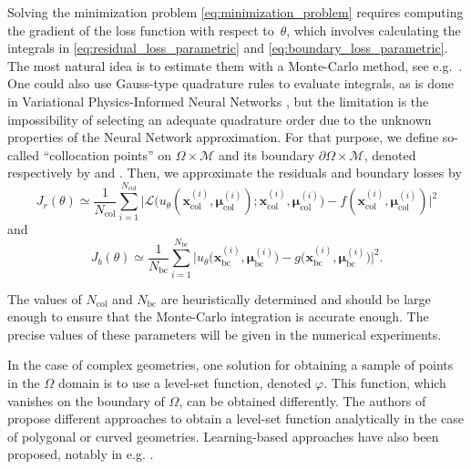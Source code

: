 Solving the minimization problem \eqref{eq:minimization_problem}
requires computing the gradient of the loss function with respect to~$\theta$, which involves calculating the integrals
in \eqref{eq:residual_loss_parametric} and \eqref{eq:boundary_loss_parametric}.
The most natural idea is to estimate them with a Monte-Carlo method, see e.g.~\cite{Caf1998}.
One could also use Gauss-type quadrature rules to evaluate integrals, as is done in Variational Physics-Informed
Neural Networks \cite{KhaZhaKar2021}, but the limitation is the impossibility of selecting an adequate
quadrature order due to the unknown properties of the Neural Network approximation.
For that purpose, we define so-called ``collocation points'' on $\Omega\times\mathcal{M}$ and its boundary $\partial\Omega\times \mathcal{M}$,
denoted respectively by  and .
Then, we approximate the residuals and boundary losses by
\begin{equation*}\label{eq:residual_loss_parametric_MC}
	J_r(\theta) \simeq
	\frac{1}{N_\text{col}} \sum_{i=1}^{N_\text{col}} \big| \mathcal{L}\big(u_\theta(\bm{x}_\text{col}^{(i)},\bm{\mu}_\text{col}^{(i)});\bm{x}_\text{col}^{(i)},\bm{\mu}_\text{col}^{(i)}\big)-f(\bm{x}_\text{col}^{(i)},\bm{\mu}_\text{col}^{(i)})  \big|^2
\end{equation*}
and
\[
	J_b(\theta) \simeq
	\frac{1}{N_\text{bc}} \sum_{i=1}^{N_\text{bc}} \big| u_\theta\big(\bm{x}_\text{bc}^{(i)},\bm{\mu}_\text{bc}^{(i)}\big) - g\big(\bm{x}_\text{bc}^{(i)},\bm{\mu}_\text{bc}^{(i)}\big) \big|^2.
\]

\begin{remark}
	The values of $N_{\mathrm{col}}$ and $N_\mathrm{bc}$
	are heuristically determined and should be large enough to ensure that the Monte-Carlo integration is accurate enough.
	The precise values of these parameters will be given in the numerical experiments.
\end{remark}

\begin{remark}
	In the case of complex geometries, one solution for obtaining a sample of points in the $\Omega$ domain is to use a level-set function, denoted $\varphi$. This function, which vanishes on the boundary of $\Omega$, can be obtained differently. The authors of \cite{Sukumar_2022} propose different approaches to obtain a level-set function analytically in the case of polygonal or curved geometries. Learning-based approaches have also been proposed, notably in e.g. \cite{park2019deepsdflearningcontinuoussigned,sitzmann2020implicitneuralrepresentationsperiodic}.
\end{remark}

